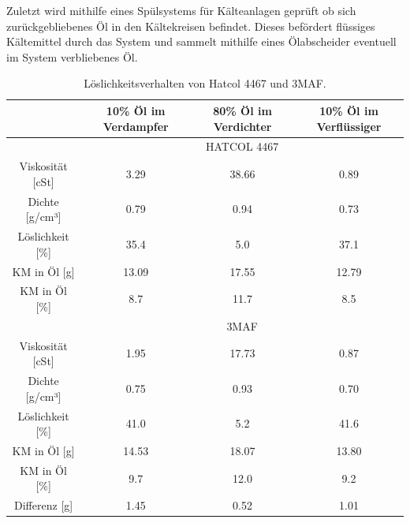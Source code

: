 Zuletzt wird mithilfe eines Spülsystems für Kälteanlagen geprüft ob sich zurückgebliebenes Öl in den Kältekreisen befindet. Dieses befördert flüssiges Kältemittel durch das System und sammelt mithilfe eines Ölabscheider eventuell im System verbliebenes Öl.

\begin{table}[h!]
\centering
\caption{Löslichkeitsverhalten von Hatcol 4467 und 3MAF.}
\label{tab:LöslichkeitHC3M}
\begin{tabular}{|cccc|}
\hline
                                           & 10\% Öl im Verdampfer      & 80\% Öl im Verdichter     & 10\% Öl im Verflüssiger \\ \hline
\multicolumn{1}{|l}{}                      & \multicolumn{3}{c|}{HATCOL 4467}                                                  \\ \hline
\multicolumn{1}{|c|}{Viskosität {[}cSt{]}} & \multicolumn{1}{c|}{3.29}  & \multicolumn{1}{c|}{38.66} & 0.89                    \\
\multicolumn{1}{|c|}{Dichte {[}g/cm³{]}}   & \multicolumn{1}{c|}{0.79}  & \multicolumn{1}{c|}{0.94}  & 0.73                    \\
\multicolumn{1}{|c|}{Löslichkeit {[}\%{]}} & \multicolumn{1}{c|}{35.4}  & \multicolumn{1}{c|}{5.0}   & 37.1                    \\
\multicolumn{1}{|c|}{KM in Öl {[}g{]}}     & \multicolumn{1}{c|}{13.09} & \multicolumn{1}{c|}{17.55} & 12.79                   \\
\multicolumn{1}{|c|}{KM in Öl {[}\%{]}}    & \multicolumn{1}{c|}{8.7}     & \multicolumn{1}{c|}{11.7}    & 8.5                       \\ \hline
\multicolumn{1}{|l}{}                      & \multicolumn{3}{c|}{3MAF}                                                         \\ \hline
\multicolumn{1}{|c|}{Viskosität {[}cSt{]}} & \multicolumn{1}{c|}{1.95}  & \multicolumn{1}{c|}{17.73} & 0.87                    \\
\multicolumn{1}{|c|}{Dichte {[}g/cm³{]}}   & \multicolumn{1}{c|}{0.75}  & \multicolumn{1}{c|}{0.93}  & 0.70                    \\
\multicolumn{1}{|c|}{Löslichkeit {[}\%{]}} & \multicolumn{1}{c|}{41.0}  & \multicolumn{1}{c|}{5.2}   & 41.6                    \\
\multicolumn{1}{|c|}{KM in Öl {[}g{]}}     & \multicolumn{1}{c|}{14.53} & \multicolumn{1}{c|}{18.07} & 13.80                   \\
\multicolumn{1}{|c|}{KM in Öl {[}\%{]}}    & \multicolumn{1}{c|}{9.7}    & \multicolumn{1}{c|}{12.0}    & 9.2                       \\ \hline
\multicolumn{1}{|c|}{Differenz {[}g{]}}    & \multicolumn{1}{c|}{1.45}  & \multicolumn{1}{c|}{0.52}  & 1.01                    \\ \hline
\end{tabular}
\end{table}




